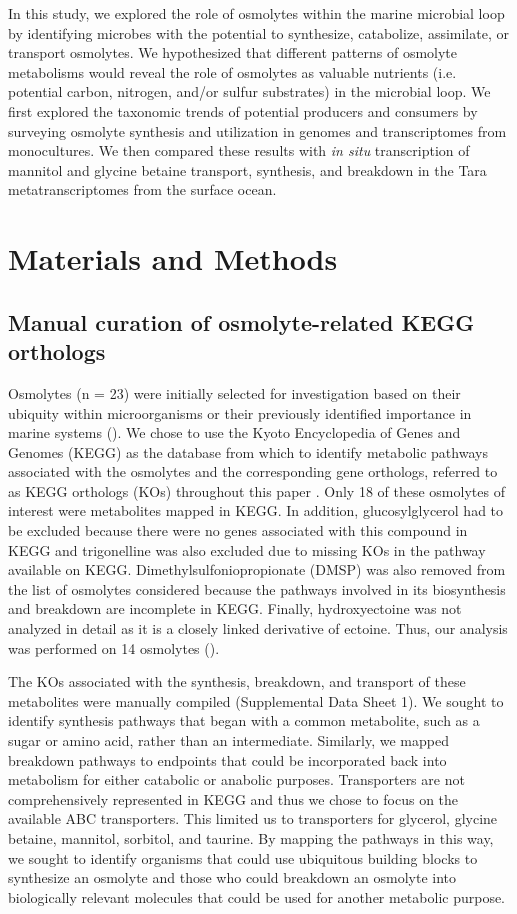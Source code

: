 \documentclass[utf8]{frontiersSCNS} %
\begin{document}
In this study, we explored the role of osmolytes within the marine microbial loop by identifying microbes with the potential to synthesize, catabolize, assimilate, or transport osmolytes. We hypothesized that different patterns of osmolyte metabolisms would reveal the role of osmolytes as valuable nutrients (i.e. potential carbon, nitrogen, and/or sulfur substrates) in the microbial loop. We first explored the taxonomic trends of potential producers and consumers by surveying osmolyte synthesis and utilization in genomes and transcriptomes from monocultures. We then compared these results with \emph{in situ} transcription of mannitol and glycine betaine transport, synthesis, and breakdown in the Tara metatranscriptomes from the surface ocean. 

\section{Materials and Methods}

\subsection{Manual curation of osmolyte-related KEGG orthologs}

Osmolytes (n = 23) were initially selected for investigation based on their ubiquity within microorganisms or their previously identified importance in marine systems (). We chose to use the Kyoto Encyclopedia of Genes and Genomes (KEGG) as the database from which to identify metabolic pathways associated with the osmolytes and the corresponding gene orthologs, referred to as KEGG orthologs (KOs) throughout this paper \citep{Kanehisa2000,Kanehisa2012}. Only 18 of these osmolytes of interest were metabolites mapped in KEGG. In addition, glucosylglycerol had to be excluded because there were no genes associated with this compound in KEGG and trigonelline was also excluded due to missing KOs in the pathway available on KEGG. Dimethylsulfoniopropionate (DMSP) was also removed from the list of osmolytes considered because the pathways involved in its biosynthesis and breakdown are incomplete in KEGG. Finally, hydroxyectoine was not analyzed in detail as it is a closely linked derivative of ectoine. Thus, our analysis was performed on 14 osmolytes ().

The KOs associated with the synthesis, breakdown, and transport of these metabolites were manually compiled (Supplemental Data Sheet 1). We sought to identify synthesis pathways that began with a common metabolite, such as a sugar or amino acid, rather than an intermediate. Similarly, we mapped breakdown pathways to endpoints that could be incorporated back into metabolism for either catabolic or anabolic purposes. Transporters are not comprehensively represented in KEGG and thus we chose to focus on the available ABC transporters. This limited us to transporters for glycerol, glycine betaine, mannitol, sorbitol, and taurine. By mapping the pathways in this way, we sought to identify organisms that could use ubiquitous building blocks to synthesize an osmolyte and those who could breakdown an osmolyte into biologically relevant molecules that could be used for another metabolic purpose.
\end{document}
